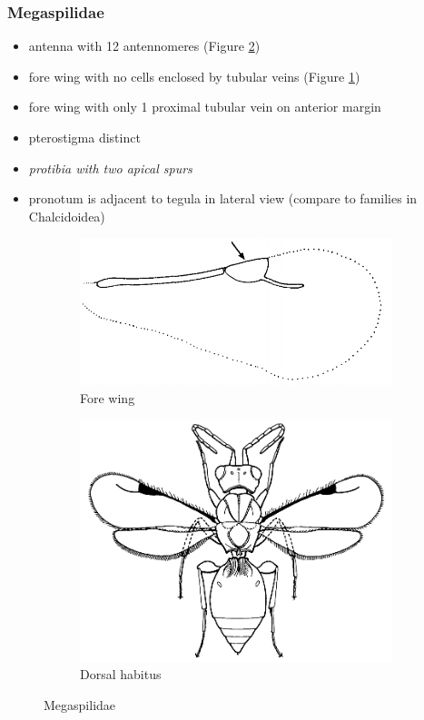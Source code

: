 \documentclass[letterpaper, 11pt]{article}
\begin{document}
\subsubsection{Megaspilidae}
\begin{itemize}
\item antenna with 12 antennomeres (Figure \ref{fig:megaspilid2})
\item fore wing with no cells enclosed by tubular veins (Figure \ref{fig:megaspilid1})
\item fore wing with only 1 proximal tubular vein on anterior margin
\item pterostigma distinct
\item \textit{protibia with two apical spurs}
\item pronotum is adjacent to tegula in lateral view (compare to families in Chalcidoidea)
\end{itemize}

\begin{figure}[ht!]
  \centering
\begin{subfigure}[ht!]{0.45\textwidth}
    \includegraphics[width=\textwidth]{MegaspilidWing}
  \caption{Fore wing \citep[][pg. 566]{goulet1993hymenoptera}}
  \label{fig:megaspilid1}
\end{subfigure}
    \hfill
\begin{subfigure}[ht!]{0.45\textwidth}
    \includegraphics[width=\textwidth]{MegaspilidHabitus}
  \caption{Dorsal habitus \citep[][Fig. 209]{goulet1993hymenoptera}}
  \label{fig:megaspilid2}
\end{subfigure}
    \caption{Megaspilidae}\label{fig:megaspilid}
\end{figure}
\end{document}
